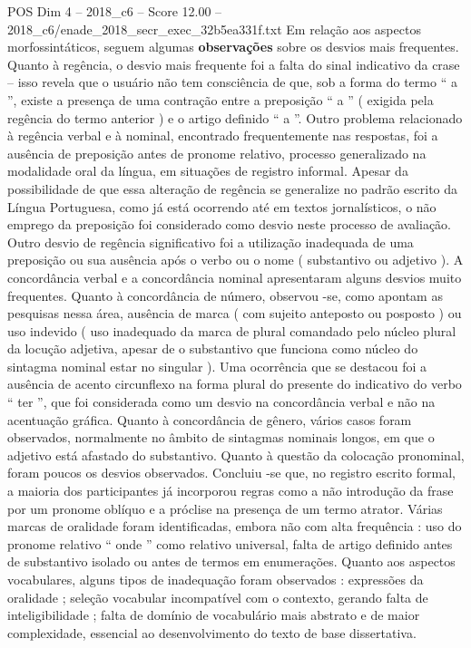 \begin{textsample}{POS Dim 4 – 2018\_c6 – Score 12.00 – 2018\_c6/enade\_2018\_secr\_exec\_32b5ea331f.txt}
Em relação aos aspectos morfossintáticos, seguem algumas \textbf{observações} sobre os desvios mais frequentes.
Quanto à regência, o desvio mais frequente foi a falta do sinal indicativo da crase – isso revela que o usuário não tem consciência de que, sob a forma do termo “ a ”, existe a presença de uma contração entre a preposição “ a ” ( exigida pela regência do termo anterior ) e o artigo definido “ a ”.
Outro problema relacionado à regência verbal e à nominal, encontrado frequentemente nas respostas, foi a ausência de preposição antes de pronome relativo, processo generalizado na modalidade oral da língua, em situações de registro informal.
Apesar da possibilidade de que essa alteração de regência se generalize no padrão escrito da Língua Portuguesa, como já está ocorrendo até em textos jornalísticos, o não emprego da preposição foi considerado como desvio neste processo de avaliação.
Outro desvio de regência significativo foi a utilização inadequada de uma preposição ou sua ausência após o verbo ou o nome ( substantivo ou adjetivo ).
A concordância verbal e a concordância nominal apresentaram alguns desvios muito frequentes.
Quanto à concordância de número, observou -se, como apontam as pesquisas nessa área, ausência de marca ( com sujeito anteposto ou posposto ) ou uso indevido ( uso inadequado da marca de plural comandado pelo núcleo plural da locução adjetiva, apesar de o substantivo que funciona como núcleo do sintagma nominal estar no singular ).
Uma ocorrência que se destacou foi a ausência de acento circunflexo na forma plural do presente do indicativo do verbo “ ter ”, que foi considerada como um desvio na concordância verbal e não na acentuação gráfica.
Quanto à concordância de gênero, vários casos foram observados, normalmente no âmbito de sintagmas nominais longos, em que o adjetivo está afastado do substantivo.
Quanto à questão da colocação pronominal, foram poucos os desvios observados.
Concluiu -se que, no registro escrito formal, a maioria dos participantes já incorporou regras como a não introdução da frase por um pronome oblíquo e a próclise na presença de um termo atrator.
Várias marcas de oralidade foram identificadas, embora não com alta frequência : uso do pronome relativo “ onde ” como relativo universal, falta de artigo definido antes de substantivo isolado ou antes de termos em enumerações.
Quanto aos aspectos vocabulares, alguns tipos de inadequação foram observados : expressões da oralidade ; seleção vocabular incompatível com o contexto, gerando falta de inteligibilidade ; falta de domínio de vocabulário mais abstrato e de maior complexidade, essencial ao desenvolvimento do texto de base dissertativa.

\end{textsample}
